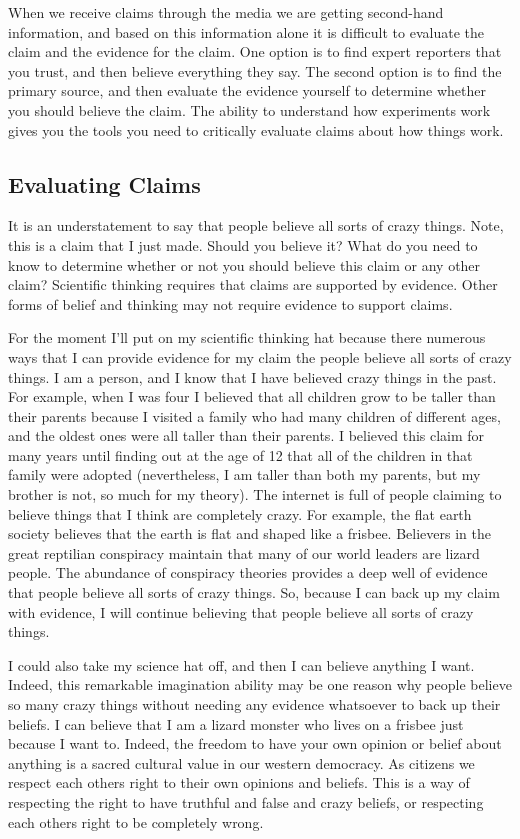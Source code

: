  When we receive claims through the media we are getting second-hand information, and based on this information alone it is difficult to evaluate the claim and the evidence for the claim. One option is to find expert reporters that you trust, and then believe everything they say. The second option is to find the primary source, and then evaluate the evidence yourself to determine whether you should believe the claim. The ability to understand how experiments work gives you the tools you need to critically evaluate claims about how things work.

\subsection{Evaluating Claims}

It is an understatement to say that people believe all sorts of crazy things. Note, this is a claim that I just made. Should you believe it? What do you need to know to determine whether or not you should believe this claim or any other claim? Scientific thinking requires that claims are supported by evidence. Other forms of belief and thinking may not require evidence to support claims. 

For the moment I'll put on my scientific thinking hat because there numerous ways that I can provide evidence for my claim the people believe all sorts of crazy things. I am a person, and I know that I have believed crazy things in the past. For example, when I was four I believed that all children grow to be taller than their parents because I visited a family who had many children of different ages, and the oldest ones were all taller than their parents. I believed this claim for many years until finding out at the age of 12 that all of the children in that family were adopted (nevertheless, I am taller than both my parents, but my brother is not, so much for my theory). The internet is full of people claiming to believe things that I think are completely crazy. For example, the flat earth society believes that the earth is flat and shaped like a frisbee. Believers in the great reptilian conspiracy maintain that many of our world leaders are lizard people. The abundance of conspiracy theories provides a deep well of evidence that people believe all sorts of crazy things. So, because I can back up my claim with evidence, I will continue believing that people believe all sorts of crazy things. 

I could also take my science hat off, and then I can believe anything I want. Indeed, this remarkable imagination ability may be one reason why people believe so many crazy things without needing any evidence whatsoever to back up their beliefs. I can believe that I am a lizard monster who lives on a frisbee just because I want to. Indeed, the freedom to have your own opinion or belief about anything is a sacred cultural value in our western democracy. As citizens we respect each others right to their own opinions and beliefs. This is a way of respecting the right to have truthful and false and crazy beliefs, or respecting each others right to be completely wrong.   


